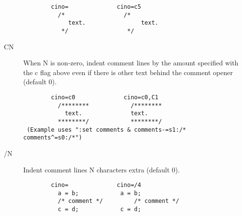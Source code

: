 \begin{description}
\begin{verbatim}
        cino=              cino=c5
          /*                 /*
             text.                text.
           */                 */
 \end{verbatim}
    \item[CN] When N is non-zero, indent comment lines by the amount specified
          with the c flag above even if there is other text behind the
          comment opener  (default 0).
\begin{verbatim}
        cino=c0              cino=c0,C1
          /********            /********
            text.              text.
          ********/            ********/
 (Example uses ":set comments & comments-=s1:/* comments^=s0:/*")
\end{verbatim}
    \item[/N]    Indent comment lines N characters extra  (default 0).
\begin{verbatim}
        cino=              cino=/4
          a = b;            a = b;
          /* comment */         /* comment */
          c = d;            c = d;
 \end{verbatim}
 

\end{description}
